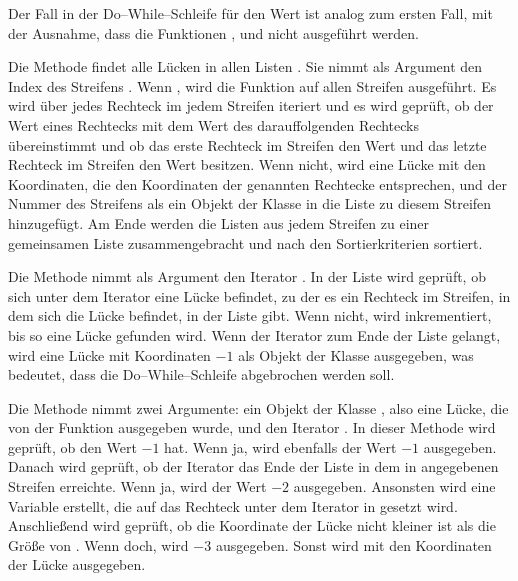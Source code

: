 Der Fall in der Do--While--Schleife für den Wert  ist analog 
zum ersten Fall, mit der Ausnahme, dass die Funktionen ,
 und  nicht ausgeführt werden.

Die Methode  findet alle Lücken
in allen Listen . 
Sie nimmt als Argument den Index des Streifens .
Wenn , wird die Funktion auf allen Streifen ausgeführt. 
Es wird über jedes Rechteck im jedem Streifen iteriert und es wird geprüft,
ob der Wert  eines Rechtecks mit dem Wert  des darauffolgenden
Rechtecks übereinstimmt und ob das erste Rechteck im Streifen
den Wert  und das letzte Rechteck im Streifen den Wert  besitzen.
Wenn nicht, wird eine Lücke mit den Koordinaten, die den Koordinaten 
der genannten Rechtecke entsprechen, und der Nummer des Streifens als ein Objekt
der Klasse  in die Liste  zu diesem Streifen hinzugefügt.
Am Ende werden die Listen  aus jedem Streifen zu einer gemeinsamen 
Liste  zusammengebracht und nach den Sortierkriterien 
 sortiert.

Die Methode  nimmt als Argument den Iterator .
In der Liste  wird geprüft, ob sich unter dem Iterator eine Lücke
befindet, zu der es ein Rechteck im Streifen, in dem sich die Lücke befindet,
in der Liste  gibt. Wenn nicht, wird  inkrementiert,
bis so eine Lücke gefunden wird.
Wenn der Iterator zum Ende der Liste  gelangt, wird
eine Lücke mit Koordinaten $-1$ als Objekt der Klasse  ausgegeben,
was bedeutet, dass die Do--While--Schleife abgebrochen werden soll.

Die Methode  nimmt zwei Argumente:
ein Objekt  der Klasse , also eine Lücke,
die von der Funktion  ausgegeben wurde, und
den Iterator . 
In dieser Methode wird geprüft, ob  den Wert $-1$ hat.
Wenn ja, wird ebenfalls der Wert $-1$ ausgegeben.
Danach wird geprüft, ob der Iterator  das Ende der Liste
 in dem in  angegebenen Streifen 
erreichte. Wenn ja, wird der Wert $-2$ ausgegeben.
Ansonsten wird eine Variable  erstellt, die 
auf das Rechteck unter dem Iterator  in 
gesetzt wird.
Anschließend wird geprüft, ob die Koordinate  der Lücke  
nicht kleiner ist als die Größe  von .
Wenn doch, wird $-3$ ausgegeben. 
Sonst wird  mit den Koordinaten der Lücke  ausgegeben.


